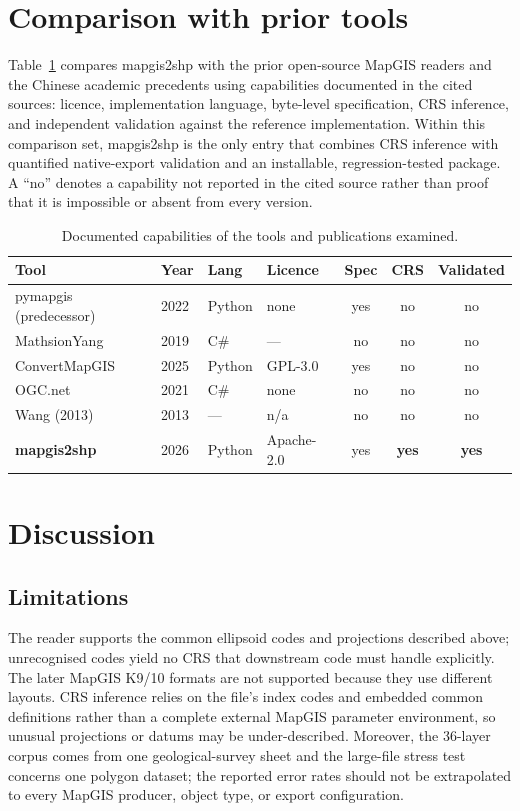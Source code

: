 \documentclass[11pt,a4paper]{article}
\begin{document}
\section{Comparison with prior tools}
Table~\ref{tab:tools} compares mapgis2shp with the prior open-source MapGIS readers and the Chinese academic precedents using capabilities documented in the cited sources: licence, implementation language, byte-level specification, CRS inference, and independent validation against the reference implementation. Within this comparison set, mapgis2shp is the only entry that combines CRS inference with quantified native-export validation and an installable, regression-tested package. A ``no'' denotes a capability not reported in the cited source rather than proof that it is impossible or absent from every version.

\begin{table}[h]
\centering
\caption{Documented capabilities of the tools and publications examined.}
\label{tab:tools}
\begin{tabular}{llllccc}
\toprule
Tool & Year & Lang & Licence & Spec & CRS & Validated \\
\midrule
pymapgis (predecessor) & 2022 & Python & none & yes & no & no \\
MathsionYang & 2019 & C\# & --- & no & no & no \\
ConvertMapGIS & 2025 & Python & GPL-3.0 & yes & no & no \\
OGC.net & 2021 & C\# & none & no & no & no \\
Wang (2013) & 2013 & --- & n/a & no & no & no \\
\textbf{mapgis2shp} & 2026 & Python & Apache-2.0 & yes & \textbf{yes} & \textbf{yes} \\
\bottomrule
\end{tabular}
\end{table}

\section{Discussion}

\subsection{Limitations}
\label{sec:discussion}
The reader supports the common ellipsoid codes and projections described above; unrecognised codes yield no CRS that downstream code must handle explicitly. The later MapGIS K9/10 formats are not supported because they use different layouts. CRS inference relies on the file's index codes and embedded common definitions rather than a complete external MapGIS parameter environment, so unusual projections or datums may be under-described. Moreover, the 36-layer corpus comes from one geological-survey sheet and the large-file stress test concerns one polygon dataset; the reported error rates should not be extrapolated to every MapGIS producer, object type, or export configuration.
\end{document}
